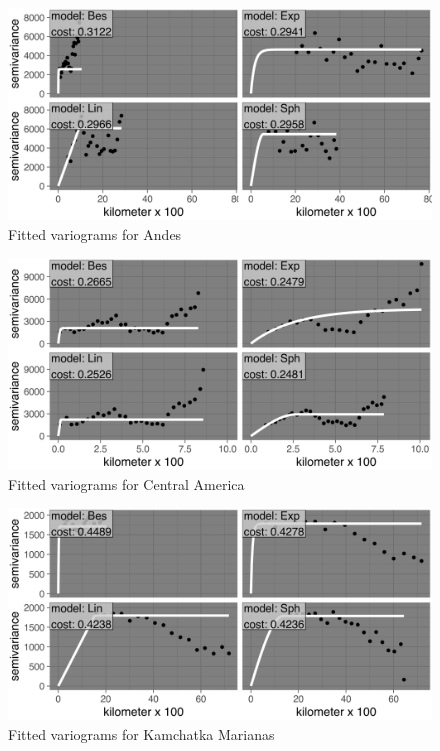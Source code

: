 \begin{figure}
\centering
\includegraphics{assets/figs/chpt3/AndesVgrms.png}
\caption[Fitted variograms for Andes]{Fitted variograms for Andes}
\end{figure}

\begin{figure}
\centering
\includegraphics{assets/figs/chpt3/CentralAmericaVgrms.png}
\caption[Fitted variograms for Central America]{Fitted variograms for Central America}
\end{figure}

\begin{figure}
\centering
\includegraphics{assets/figs/chpt3/KamchatkaMarianasVgrms.png}
\caption[Fitted variograms for Kamchatka Marianas]{Fitted variograms for Kamchatka Marianas}
\end{figure}

